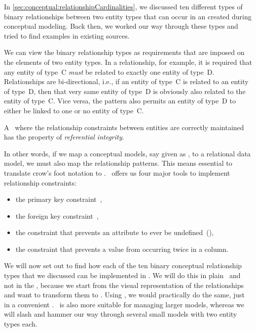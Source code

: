 %
In \cref{sec:conceptual:relationshipCardinalities}, we discussed ten different types of binary relationships between two entity types that can occur in an  created during conceptual modeling.
Back then, we worked our way through these types and tried to find examples in existing sources.

We can view the binary relationship types as requirements that are imposed on the elements of two entity types.
In a  relationship, for example, it is required that any entity of type~C \emph{must} be related to exactly one entity of type~D.
Relationships are bi-directional, i.e., if an entity of type~C is related to an entity of type~D, then that very same entity of type~D is obviously also related to the entity of type~C.
Vice versa, the  pattern also permits an entity of type~D to either be linked to one or no entity of type~C.%
%
\begin{definition}%
A \db\ where the relationship constraints between entities are correctly maintained has the property of \emph{referential integrity}.%
\end{definition}%
%
In other words, if we map a conceptual models, say given as , to a relational data model, we must also map the relationship patterns.
This means essential to translate crow's foot notation to \sql.
\sql\ offers us four major tools to implement relationship constraints:%
%
\begin{itemize}%
%
\item the primary key constraint~,%
%
\item the foreign key constraint~,%
%
\item the  constraint that prevents an attribute to ever be undefined~(),%
%
\item the  constraint that prevents a value from occurring twice in a column.%
%
\end{itemize}%
%
We will now set out to find how each of the ten binary conceptual relationship types that we discussed can be implemented in \sql.
We will do this in plain \sql\ and not in the \pgmodeler, because we start from the visual representation of the relationships and want to transform them to \sql.
Using \pgmodeler, we would practically do the same, just in a convenient .
\pgmodeler\ is also more suitable for managing larger models, whereas we will slash and hammer our way through several small models with two entity types each.

